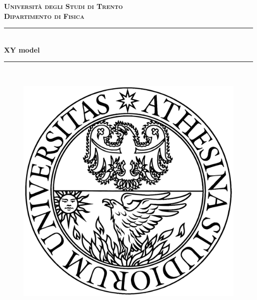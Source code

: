 \documentclass[12pt,twoside,openany]{report}
\begin{document}

\begin{titlepage} 
\newcommand{\HRule}{\rule{\linewidth}{0.5mm}} 
	  
\center %

\textsc{\textbf{\LARGE Università degli Studi di Trento}}\\[1.5cm] 
		 
		   
\textsc{\textbf{\Large Dipartimento di Fisica }}\\[0.5cm] 
		     

\HRule\\[0.4cm]
	
{\huge\bfseries XY model}\\[0.1cm] %

\HRule\\[1.5cm]

\vfill
\begin{figure}[h]
\centering
\includegraphics[scale=0.18]{logo.png}
\end{figure}


\end{titlepage}
\end{document}
